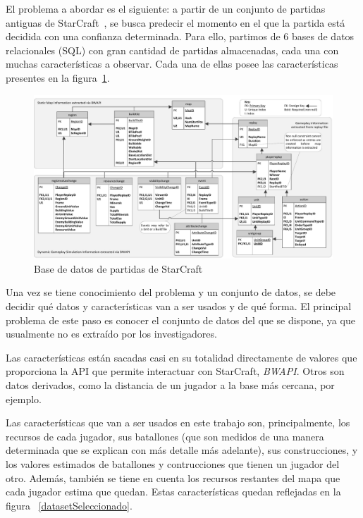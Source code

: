 \documentclass[a4paper,11pt]{book}\usepackage[]{graphicx}\usepackage[]{color}
\makeatletter
\def\maxwidth{ %
  \ifdim\Gin@nat@width>\linewidth
    \linewidth
  \else
    \Gin@nat@width
  \fi
}
\theoremstyle{plain}
\theoremstyle{definition}
\makeatother
\begin{document}
El problema a abordar es el siguiente: a partir de un conjunto de
partidas antiguas de StarCraft~\cite{dataset2014}, se busca predecir
el momento en el que la partida está decidida con una confianza
determinada. Para ello, partimos de 6 bases de datos relacionales
(SQL) con gran cantidad de partidas almacenadas, cada una con muchas
características a observar. Cada una de ellas posee las
características presentes en la figura~\ref{dataset}.


\begin{figure}
    \centering
    \includegraphics[width=\maxwidth]{figure/Robertson14DatabaseDiagram}
    \caption{Base de datos de partidas de StarCraft}
    \label{dataset}
\end{figure}



Una vez se tiene conocimiento del problema y un conjunto de datos, se
debe decidir qué datos y características van a ser usados y de qué
forma. El principal problema de este paso es conocer el conjunto de
datos del que se dispone, ya que usualmente no es extraído por los
investigadores.

Las características están sacadas casi en su totalidad directamente de
valores que proporciona la API que permite interactuar con StarCraft,
\emph{BWAPI}. Otros son datos derivados, como la distancia de un
jugador a la base más cercana, por ejemplo.

Las características que van a ser usados en este trabajo son,
principalmente, los recursos de cada jugador, sus batallones (que son
medidos de una manera determinada que se explican con más detalle más
adelante), sus construcciones, y los valores estimados de batallones y
contrucciones que tienen un jugador del otro. Además, también se tiene
en cuenta los recursos restantes del mapa que cada jugador estima que
quedan. Estas características quedan reflejadas en la figura
~\ref{datasetSeleccionado}.
\end{document}
